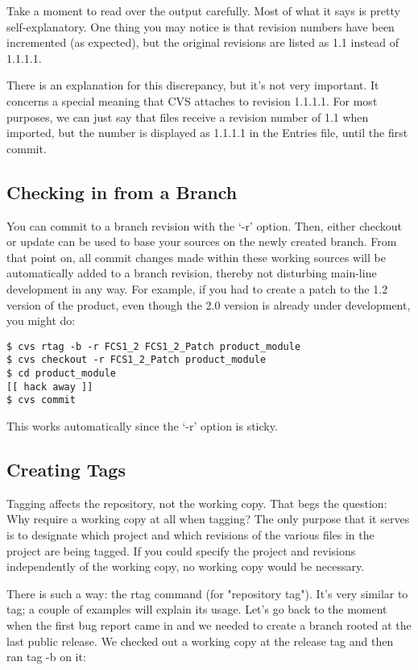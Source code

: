 Take a moment to read over the output carefully. Most of what it says is pretty self-explanatory. One thing you may notice is that revision numbers have been incremented (as expected), but the original revisions are listed as 1.1 instead of 1.1.1.1. 

There is an explanation for this discrepancy, but it's not very important. It concerns a special meaning that CVS attaches to revision 1.1.1.1. For most purposes, we can just say that files receive a revision number of 1.1 when imported, but the number is displayed as 1.1.1.1 in the Entries file, until the first commit.


\subsection{Checking in from a Branch}

You can commit to a branch revision with the `-r' option. Then, either checkout or update can be used to base your sources on the newly created branch. From that point on, all commit changes made within these working sources will be automatically added to a branch revision, thereby not disturbing main-line development in any way. For example, if you had to create a patch to the 1.2 version of the product, even though the 2.0 version is already under development, you might do: 

\begin{verbatim}
$ cvs rtag -b -r FCS1_2 FCS1_2_Patch product_module
$ cvs checkout -r FCS1_2_Patch product_module
$ cd product_module
[[ hack away ]]
$ cvs commit
\end{verbatim}

This works automatically since the `-r' option is sticky.


\subsection{Creating Tags}

Tagging affects the repository, not the working copy. That begs the question: Why require a working copy at all when tagging? The only purpose that it serves is to designate which project and which revisions of the various files in the project are being tagged. If you could specify the project and revisions independently of the working copy, no working copy would be necessary.

There is such a way: the rtag command (for "repository tag"). It's very similar to tag; a couple of examples will explain its usage. Let's go back to the moment when the first bug report came in and we needed to create a branch rooted at the last public release. We checked out a working copy at the release tag and then ran tag -b on it: 

